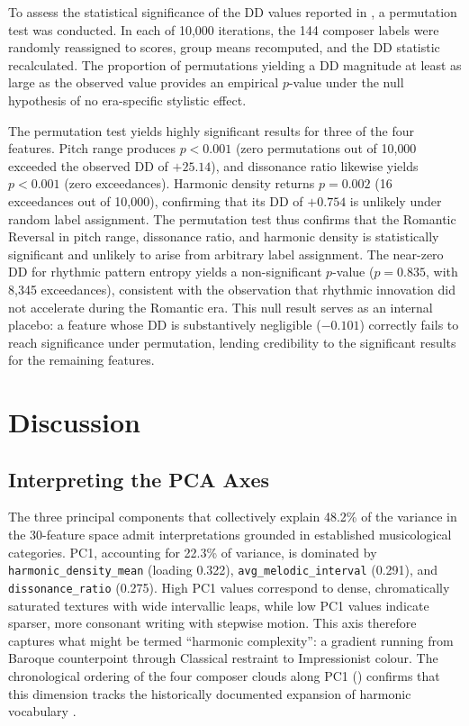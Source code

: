 \documentclass[]{interact}
\theoremstyle{plain}
\theoremstyle{definition}
\theoremstyle{remark}
\begin{document}
To assess the statistical significance of the DD values reported in
, a permutation test was conducted. In each of
10{,}000 iterations, the 144 composer labels were randomly reassigned to
scores, group means recomputed, and the DD statistic recalculated. The
proportion of permutations yielding a DD magnitude at least as large as
the observed value provides an empirical $p$-value under the null
hypothesis of no era-specific stylistic effect.

The permutation test yields highly significant results for three of the
four features. Pitch range produces $p < 0.001$ (zero permutations out
of 10{,}000 exceeded the observed DD of $+25.14$), and dissonance ratio
likewise yields $p < 0.001$ (zero exceedances). Harmonic density returns
$p = 0.002$ (16 exceedances out of 10{,}000), confirming that its DD of
$+0.754$ is unlikely under random label assignment. The permutation test
thus confirms that the Romantic Reversal in pitch range, dissonance
ratio, and harmonic density is statistically significant and unlikely to
arise from arbitrary label assignment. The near-zero DD for rhythmic
pattern entropy yields a non-significant $p$-value ($p = 0.835$, with
8{,}345 exceedances), consistent with the observation that rhythmic
innovation did not accelerate during the Romantic era. This null result
serves as an internal placebo: a feature whose DD is substantively
negligible ($-0.101$) correctly fails to reach significance under
permutation, lending credibility to the significant results for the
remaining features.

\section{Discussion}\label{sec:discussion}

\subsection{Interpreting the PCA Axes}

The three principal components that collectively explain 48.2\% of the
variance in the 30-feature space admit interpretations grounded in
established musicological categories. PC1, accounting for 22.3\% of variance,
is dominated by \texttt{harmonic\_density\_mean} (loading 0.322),
\texttt{avg\_melodic\_interval} (0.291), and \texttt{dissonance\_ratio}
(0.275). High PC1 values correspond to dense, chromatically saturated
textures with wide intervallic leaps, while low PC1 values indicate sparser,
more consonant writing with stepwise motion. This axis therefore captures
what might be termed ``harmonic complexity'': a gradient running from
Baroque counterpoint through Classical restraint to Impressionist colour.
The chronological ordering of the four composer clouds along PC1
() confirms that this dimension tracks the
historically documented expansion of harmonic vocabulary
\citep{White2013}.
\end{document}
